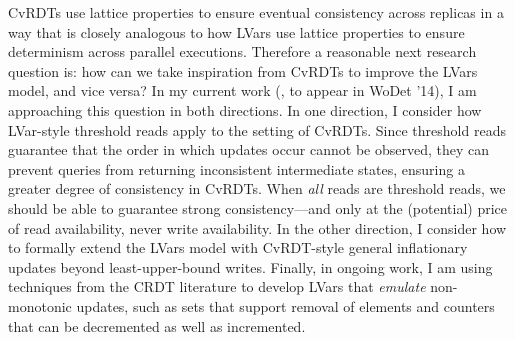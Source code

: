 \documentclass{article}
\begin{document}
CvRDTs use lattice properties to ensure eventual consistency across
replicas in a way that is closely analogous to how LVars use lattice
properties to ensure determinism across parallel executions.
Therefore a reasonable next research question is: how can we take
inspiration from CvRDTs to improve the LVars model, and vice versa?
In my current work (\cite{joining-wodet}, to appear in WoDet '14), I
am approaching this question in both directions.  In one direction, I
consider how LVar-style threshold reads apply to the setting of
CvRDTs.  Since threshold reads guarantee that the order in which
updates occur cannot be observed, they can prevent queries from
returning inconsistent intermediate states, ensuring a greater degree
of consistency in CvRDTs.  When \emph{all} reads are threshold reads,
we should be able to guarantee strong consistency---and only at the
(potential) price of read availability, never write availability. In
the other direction, I consider how to formally extend the LVars model
with CvRDT-style general inflationary updates beyond least-upper-bound
writes.  Finally, in ongoing work, I am using techniques from the CRDT
literature \cite{crdts-tr} to develop LVars that \emph{emulate}
non-monotonic updates, such as sets that support removal of elements
and counters that can be decremented as well as incremented.


\newcommand{\myname}[0]{\textbf{Lindsey Kuper}}

\end{document}
